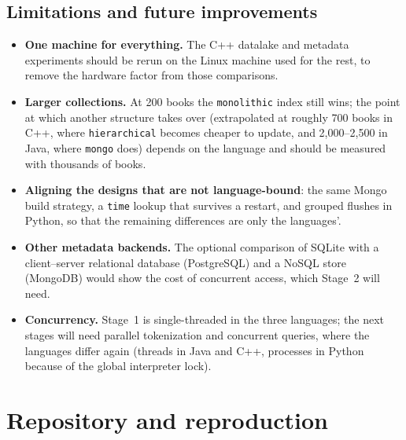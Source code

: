 \documentclass[11pt,a4paper]{article}
\newcommand{\code}[1]{\texttt{#1}}
\begin{document}
\subsection{Limitations and future improvements}\label{sec:future}
\begin{itemize}
  \item \textbf{One machine for everything.} The C++ datalake and metadata experiments should be rerun
        on the Linux machine used for the rest, to remove the hardware factor from those comparisons.
  \item \textbf{Larger collections.} At 200 books the \code{monolithic} index still wins; the point at
        which another structure takes over (extrapolated at roughly 700 books in C++, where
        \code{hierarchical} becomes cheaper to update, and 2,000--2,500 in Java, where \code{mongo}
        does) depends on the language and should be measured with thousands of books.
  \item \textbf{Aligning the designs that are not language-bound}: the same Mongo build strategy, a
        \code{time} lookup that survives a restart, and grouped flushes in Python, so that the
        remaining differences are only the languages'.
  \item \textbf{Other metadata backends.} The optional comparison of SQLite with a client--server
        relational database (PostgreSQL) and a NoSQL store (MongoDB) would show the cost of
        concurrent access, which Stage~2 will need.
  \item \textbf{Concurrency.} Stage~1 is single-threaded in the three languages; the next stages will
        need parallel tokenization and concurrent queries, where the languages differ again (threads
        in Java and C++, processes in Python because of the global interpreter lock).
\end{itemize}

\appendix
\section{Repository and reproduction}
\end{document}
